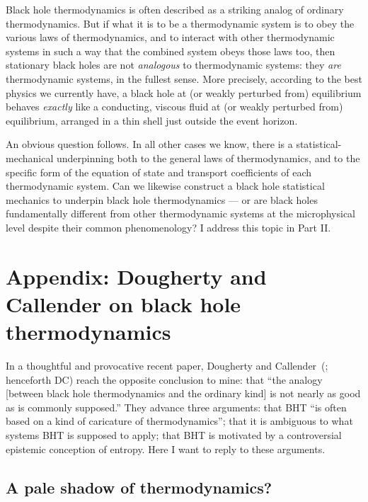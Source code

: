 \documentclass[12pt]{article}
\begin{document}
Black hole thermodynamics is often described as a striking analog of ordinary thermodynamics. But if what it is to be a thermodynamic system is to obey the various laws of thermodynamics, and to interact with other thermodynamic systems in such a way that the combined system obeys those laws too, then stationary black holes are not \emph{analogous} to thermodynamic systems: they \emph{are} thermodynamic systems, in the fullest sense. More precisely, according to the best physics we currently have, a black hole at (or weakly perturbed from) equilibrium behaves \emph{exactly} like a conducting, viscous fluid at (or weakly perturbed from) equilibrium, arranged in a thin shell just outside the event horizon.

An obvious question follows. In all other cases we know, there is a statistical-mechanical underpinning both to the general laws of thermodynamics, and to the specific form of the equation of state and transport coefficients of each thermodynamic system. Can we likewise construct a black hole statistical mechanics to underpin black hole thermodynamics --- or are black holes fundamentally different from other thermodynamic systems at the microphysical level despite their common phenomenology? I address this topic in Part II.

\appendix
\section{Appendix: Dougherty and Callender on black hole thermodynamics}

In a thoughtful and provocative recent paper, Dougherty and Callender~(; henceforth DC) reach the opposite conclusion to mine: that ``the analogy [between black hole thermodynamics and the ordinary kind] is not nearly as good as is commonly supposed.'' They advance three arguments: that BHT ``is often based on a kind of caricature of thermodynamics''; that it is ambiguous to what systems BHT is supposed to apply; that BHT is motivated by a controversial epistemic conception of entropy. Here I want to reply  to these arguments.

\subsection{A pale shadow of thermodynamics?}
\end{document}
